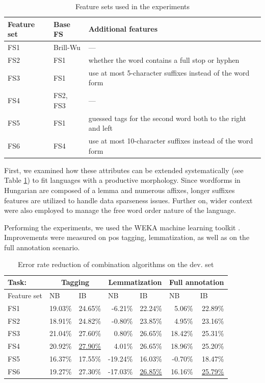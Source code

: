 \begin{table}[H]
\centering
\caption{Feature sets used in the experiments}\label{tab:comb-feature-sets}
\begin{tabular}{l l l}
\hline
Feature set & Base FS & Additional features \\
\hline
FS1 & Brill-Wu & --- \\
FS2 & FS1 & whether the word contains a full stop or hyphen \\
FS3 & FS1 & use at most 5-character suffixes instead of the word form \\
FS4 & FS2, FS3 & --- \\ 
FS5 & FS1 & guessed tags for the second word both to the right and left \\
FS6 & FS4 & use at most 10-character suffixes instead of the word form \\
\hline
\end{tabular}
\end{table}

First, we examined how these attributes can be extended systematically (see Table \ref{tab:comb-feature-sets}) to fit languages with a productive morphology.
Since wordforms in Hungarian are composed of a lemma and numerous affixes, longer suffixes features are utilized to handle data sparseness issues.
Further on, wider context were also employed to manage the free word order nature of the language. 


Performing the experiments, we used the WEKA machine learning toolkit \cite{Hall2009}.
Improvements were measured on \acrshort{pos} tagging, lemmatization, as well as on the full annotation scenario.

\begin{table}[H]
\centering
\caption{Error rate reduction of combination algorithms on the dev. set}\label{tab:comb-reduction-rates}
\begin{tabular}{l r r r r r r}
\hline
Task:& \multicolumn{2}{c}{Tagging} & \multicolumn{2}{c}{Lemmatization} & \multicolumn{2}{c}{Full annotation} \\
\hline
Feature set & \multicolumn{1}{l}{NB} & \multicolumn{1}{l}{IB} & \multicolumn{1}{l}{NB} & \multicolumn{1}{l}{IB} & \multicolumn{1}{l}{NB} & \multicolumn{1}{l}{IB} \\
\hline
FS1 & 19.03\% & 24.65\% & -6.21\% & 22.24\% & 5.06\% & 22.89\% \\
FS2 & 18.91\% & 24.82\% & -0.80\% & 23.85\% & 4.95\% & 23.16\% \\
FS3 & 21.04\% & 27.60\% & 0.80\% & 26.65\% & 18.42\% & 25.31\% \\
FS4 & 20.92\% & \underline{27.90\%} & 4.01\% & 26.65\% & 18.96\% & 25.20\% \\
FS5 & 16.37\% & 17.55\% & -19.24\% & 16.03\% & -0.70\% & 18.47\% \\
FS6 & 19.27\% & 27.30\% & -17.03\% & \underline{26.85\%} & 16.16\% & \underline{25.79\%} \\
\hline
\end{tabular}
\end{table}


